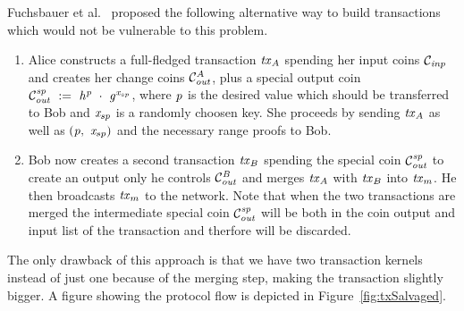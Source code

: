 Fuchsbauer et al.~\cite{fuchsbauer2019aggregate} proposed the following alternative way to build transactions which would not be vulnerable to this problem.
\begin{enumerate}
    \item Alice constructs a full-fledged transaction $\mathit{tx}_A$ spending her input coins $\mathcal{C}_{\mathit{inp}}$ and creates her change coins $\mathcal{C}_{\mathit{out}}^A$, plus a special output coin $\mathcal{C}_{\mathit{out}}^{\mathit{sp}} ~:=~ \mathit{h}^{\mathit{p}} ~\cdot~ \mathit{g}^{\mathit{x}_{sp}}$,
    where $\mathit{p}$ is the desired value which should be transferred to Bob and $\mathit{x}_{sp}$ is a randomly choosen key. She proceeds by sending $\mathit{tx}_A$ as well as $(\mathit{p} ,~ \mathit{x}_{sp})$ and the necessary range
    proofs to Bob.
    \item Bob now creates a second transaction $\mathit{tx}_B$ spending the special coin $\mathcal{C}_{\mathit{out}}^{\mathit{sp}}$ to create an output only he controls $\mathcal{C}_{\mathit{out}}^{\mathit{B}}$ and merges $\mathit{tx}_A$ with $\mathit{tx}_B$
    into $\mathit{tx}_m$. He then broadcasts $\mathit{tx}_m$ to the network. Note that when the two transactions are merged the intermediate special coin $\mathcal{C}_{\mathit{out}}^{\mathit{sp}}$ will be both in the coin output and input list
    of the transaction and therfore will be discarded.
\end{enumerate}
The only drawback of this approach is that we have two transaction kernels instead of just one because of the merging step, making the transaction slightly bigger.
A figure showing the protocol flow is depicted in Figure~\ref{fig:txSalvaged}.

